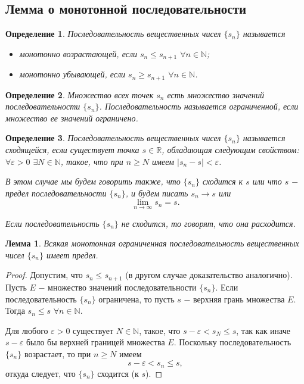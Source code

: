 \documentclass{article}
\newtheorem*{lemma}{Лемма}
\newtheorem{definition}{Определение}[section]
\begin{document}
\subsection{Лемма о монотонной последовательности}

\begin{definition}
Последовательность вещественных чисел \(\{s_n\}\) называется
\begin{itemize}
    \item монотонно возрастающей, если \(s_n \leq s_{n + 1}\) \(\forall n \in \mathbb{N}\);
    \item монотонно убывающей, если \(s_n \geq s_{n + 1}\) \(\forall n \in \mathbb{N}\).
\end{itemize}
\end{definition}

\begin{definition}
Множество всех точек \(s_n\) есть множество значений последовательности \(\{s_n\}\). Последовательность называется ограниченной, если множество ее значений ограничено.
\end{definition}

\begin{definition}
Последовательность вещественных чисел \(\{s_n\}\) называется сходящейся, если существует точка \(s \in \mathbb{R}\), обладающая следующим свойством: \(\forall \varepsilon > 0\) \(\exists N \in \mathbb{N}\), такое, что при \(n \geq N\) имеем \(| s_n - s| < \varepsilon\).

В этом случае мы будем говорить также, что \(\{s_n\}\) сходится к \(s\) или что \(s\) \(-\) предел последовательности \(\{s_n\}\), и будем писать \(s_n \to s\) или
\[
\lim_{n \to \infty} s_n = s.
\]

Если последовательность \(\{s_n\}\) не сходится, то говорят, что она расходится.
\end{definition}

\begin{lemma}
Всякая монотонная ограниченная последовательность вещественных чисел \(\{s_n\}\) имеет предел.
\end{lemma}

\begin{proof}
Допустим, что \(s_n \leq s_{n + 1}\) (в другом случае доказательство аналогично). Пусть \(E\) \(-\) множество значений последовательности \(\{s_n\}\). Если последовательность \(\{s_n\}\) ограничена, то пусть \(s\) \(-\) верхняя грань множества \(E\). Тогда \(s_n \leq s\) \(\forall n \in \mathbb{N}\).

Для любого \(\varepsilon > 0\) существует \(N \in \mathbb{N}\), такое, что \(s - \varepsilon < s_N \leq s\), так как иначе \(s - \varepsilon\) было бы верхней границей множества \(E\). Поскольку последовательность \(\{s_n\}\) возрастает, то при \(n \geq N\) имеем
\[
s - \varepsilon < s_n \leq s,
\]
откуда следует, что \(\{s_n\}\) сходится (к \(s\)).
\end{proof}
\end{document}
